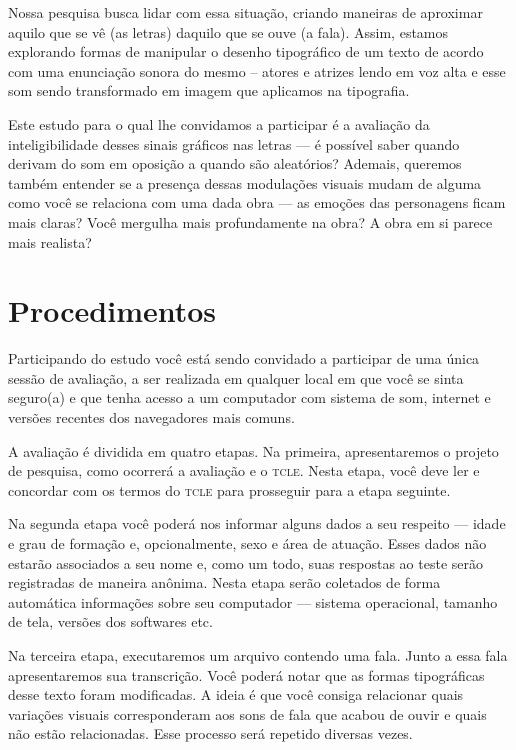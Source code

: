 \documentclass[a4paper,11pt,titlepage,singlespacing]{article}
\begin{document}
Nossa pesquisa busca lidar com essa situação, criando maneiras de aproximar aquilo que se vê (as letras) daquilo que se ouve (a fala). Assim, estamos explorando formas de manipular o desenho tipográfico de um texto de acordo com uma enunciação sonora do mesmo – atores e atrizes lendo em voz alta e esse som sendo transformado em imagem que aplicamos na tipografia.

Este estudo para o qual lhe convidamos a participar é a avaliação da inteligibilidade desses sinais gráficos nas letras — é possível saber quando derivam do som em oposição a quando são aleatórios? Ademais, queremos também entender se a presença dessas modulações visuais mudam de alguma como você se relaciona com uma dada obra — as emoções das personagens ficam mais claras? Você mergulha mais profundamente na obra? A obra em si parece mais realista?

\section*{Procedimentos}

\noindent Participando do estudo você está sendo convidado a participar de uma única sessão de avaliação, a ser realizada em qualquer local em que você se sinta seguro(a) e que tenha acesso a um computador com sistema de som, internet e versões recentes dos navegadores mais comuns.

A avaliação é dividida em quatro etapas. Na primeira, apresentaremos o projeto de pesquisa, como ocorrerá a avaliação e o \textsc{tcle}. Nesta etapa, você deve ler e concordar com os termos do \textsc{tcle} para prosseguir para a etapa seguinte.

Na segunda etapa você poderá nos informar alguns dados a seu respeito — idade e grau de formação e, opcionalmente, sexo e área de atuação. Esses dados não estarão associados a seu nome e, como um todo, suas respostas ao teste serão registradas de maneira anônima. Nesta etapa serão coletados de forma automática informações sobre seu computador — sistema operacional, tamanho de tela, versões dos softwares etc.

Na terceira etapa, executaremos um arquivo contendo uma fala. Junto a essa fala apresentaremos sua transcrição. Você poderá notar que as formas tipográficas desse texto foram modificadas. A ideia é que você consiga relacionar quais variações visuais corresponderam aos sons de fala que acabou de ouvir e quais não estão relacionadas. Esse processo será repetido diversas vezes.
\end{document}

